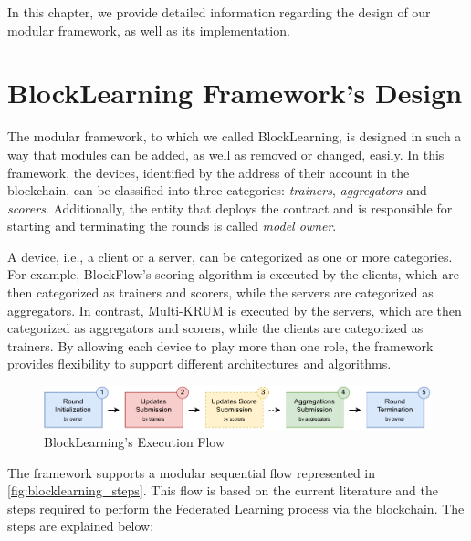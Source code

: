 In this chapter, we provide detailed information regarding the design of our modular framework, as well as its implementation.

\section{BlockLearning Framework's Design}\label{framework:design}

The modular framework, to which we called BlockLearning, is designed in such a way that modules can be added, as well as removed or changed, easily. In this framework, the devices, identified by the address of their account in the blockchain, can be classified into three categories: \textit{trainers}, \textit{aggregators} and \textit{scorers}. Additionally, the entity that deploys the contract and is responsible for starting and terminating the rounds is called \textit{model owner}.

A device, i.e., a client or a server, can be categorized as one or more categories. For example, BlockFlow's scoring algorithm is executed by the clients, which are then categorized as trainers and scorers, while the servers are categorized as aggregators. In contrast, Multi-KRUM is executed by the servers, which are then categorized as aggregators and scorers, while the clients are categorized as trainers. By allowing each device to play more than one role, the framework provides flexibility to support different architectures and algorithms.

\begin{figure}[!ht]
    \centering
    \includegraphics[width=1\textwidth]{graphics/sequence.pdf}
    \caption{BlockLearning's Execution Flow}
    \label{fig:blocklearning_steps}
\end{figure}

The framework supports a modular sequential flow represented in \autoref{fig:blocklearning_steps}. This flow is based on the current literature and the steps required to perform the Federated Learning process via the blockchain. The steps are explained below:

